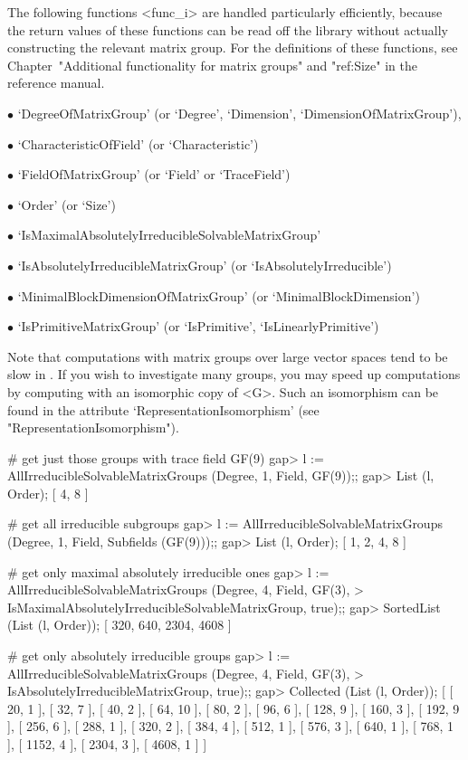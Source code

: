 The following functions <func_i> are handled particularly efficiently, because the
return values of these functions can be read off the
{\IRREDSOL} library without actually constructing the relevant matrix group. For the
definitions of these functions, see Chapter~"Additional functionality for matrix
groups" and "ref:Size" in the {\GAP} reference manual.

\beginlist

\item{$\bullet$} `DegreeOfMatrixGroup' (or `Degree', `Dimension',
`DimensionOfMatrixGroup'), 
\item{$\bullet$} `CharacteristicOfField' (or `Characteristic')
\item{$\bullet$} `FieldOfMatrixGroup' (or `Field' or `TraceField')
\item{$\bullet$} `Order' (or `Size')
\item{$\bullet$} `IsMaximalAbsolutelyIrreducibleSolvableMatrixGroup' 
\item{$\bullet$} `IsAbsolutelyIrreducibleMatrixGroup' (or
`IsAbsolutelyIrreducible')
\item{$\bullet$} `MinimalBlockDimensionOfMatrixGroup' (or
`MinimalBlockDimension')
\item{$\bullet$} `IsPrimitiveMatrixGroup' (or `IsPrimitive',
`IsLinearlyPrimitive')

\endlist
Note that computations with matrix groups over large vector spaces tend to be slow in {\GAP}. 
If you wish to investigate many groups, you may speed up computations by computing with
an isomorphic copy of <G>. Such an isomorphism can be found in the attribute 
`RepresentationIsomorphism' (see "RepresentationIsomorphism").

\beginexample
# get just those groups with trace field GF(9)
gap> l := AllIrreducibleSolvableMatrixGroups (Degree, 1, Field, GF(9));;
gap> List (l, Order);
[ 4, 8 ]

# get all irreducible subgroups
gap> l := AllIrreducibleSolvableMatrixGroups (Degree, 1, Field, Subfields (GF(9)));;
gap> List (l, Order);
[ 1, 2, 4, 8 ]

# get only maximal absolutely irreducible ones
gap> l := AllIrreducibleSolvableMatrixGroups (Degree, 4, Field, GF(3),
>             IsMaximalAbsolutelyIrreducibleSolvableMatrixGroup, true);;
gap> SortedList (List (l, Order));
[ 320, 640, 2304, 4608 ]

# get only absolutely irreducible groups
gap> l := AllIrreducibleSolvableMatrixGroups (Degree, 4, Field, GF(3),
> IsAbsolutelyIrreducibleMatrixGroup, true);;
gap> Collected (List (l, Order));
[ [ 20, 1 ], [ 32, 7 ], [ 40, 2 ], [ 64, 10 ], [ 80, 2 ], [ 96, 6 ], 
  [ 128, 9 ], [ 160, 3 ], [ 192, 9 ], [ 256, 6 ], [ 288, 1 ], [ 320, 2 ], 
  [ 384, 4 ], [ 512, 1 ], [ 576, 3 ], [ 640, 1 ], [ 768, 1 ], [ 1152, 4 ], 
  [ 2304, 3 ], [ 4608, 1 ] ]
\endexample

